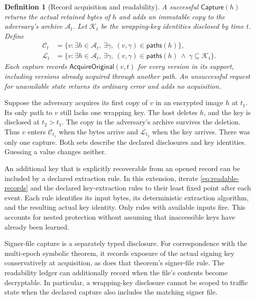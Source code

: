 \documentclass[pdflatex]{sn-jnl}
\theoremstyle{thmstyleone}
\theoremstyle{thmstylethree}
\newtheorem{definition}[theorem]{Definition}
\theoremstyle{thmstyletwo}
\begin{document}
\begin{definition}[Record acquisition and readability]
\label{def:record-acquisition}
A successful $\mathsf{Capture}(h)$ returns the actual retained bytes of $h$
and adds an immutable copy to the adversary's archive $\mathcal A_t$.
Let $\mathcal K_t$ be the wrapping-key identities disclosed by time $t$.
Define
\begin{align}
  \mathcal C_t
    &=\{v:\exists h\in\mathcal A_t,\ \exists\gamma,\
                    (v,\gamma)\in\mathsf{paths}(h)\}, \label{eq:acquired-records}\\
  \mathcal L_t
    &=\{v:\exists h\in\mathcal A_t,\ \exists\gamma,\
          (v,\gamma)\in\mathsf{paths}(h)
          \ \wedge\ \gamma\subseteq\mathcal K_t\}.
          \label{eq:readable-records}
\end{align}
Each capture records $\mathsf{AcquireOriginal}(v,t)$ for every version in its
support, including versions already acquired through another path.
An unsuccessful request for unavailable state returns its ordinary error and
adds no acquisition.
\end{definition}

Suppose the adversary acquires its first copy of $v$ in an encrypted
image $h$ at $t_1$. Its only path to $v$ still lacks one wrapping key.
The host deletes $h$, and the key is disclosed at $t_2>t_1$. The copy
in the adversary's archive survives the deletion. Thus $v$ enters
$\mathcal C_{t_1}$ when the bytes arrive and $\mathcal L_{t_2}$ when
the key arrives. There was only one capture. Both sets describe the
declared disclosures and key identities. Guessing a value changes neither.

An additional key that is explicitly recoverable from an opened record can be
included by a declared extraction rule.  In this extension, iterate
\eqref{eq:readable-records} and the declared key-extraction rules to their least
fixed point after each event.  Each rule identifies its input bytes, its
deterministic extraction algorithm, and the resulting actual key identity.
Only rules with available inputs fire.  This accounts for nested protection
without assuming that inaccessible keys have already been learned.

Signer-file capture is a separately typed disclosure.  For correspondence
with the multi-epoch symbolic theorem, it records exposure of the actual signing
key conservatively at acquisition, as does that theorem's signer-file rule.
The readability ledger can additionally record when the file's contents
become decryptable.  In particular, a wrapping-key disclosure cannot be
scoped to traffic state when the declared capture also includes the matching
signer file.
\end{document}
